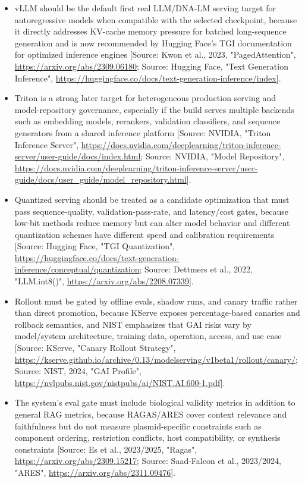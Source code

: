 \documentclass[11pt]{report}
\begin{document}
\begin{itemize}
\item vLLM should be the default first real LLM/DNA-LM serving target for autoregressive models when compatible with the selected checkpoint, because it directly addresses KV-cache memory pressure for batched long-sequence generation and is now recommended by Hugging Face's TGI documentation for optimized inference engines [Source: Kwon et al., 2023, "PagedAttention", \url{https://arxiv.org/abs/2309.06180}; Source: Hugging Face, "Text Generation Inference", \url{https://huggingface.co/docs/text-generation-inference/index}].
\item Triton is a strong later target for heterogeneous production serving and model-repository governance, especially if the build serves multiple backends such as embedding models, rerankers, validation classifiers, and sequence generators from a shared inference platform [Source: NVIDIA, "Triton Inference Server", \url{https://docs.nvidia.com/deeplearning/triton-inference-server/user-guide/docs/index.html}; Source: NVIDIA, "Model Repository", \url{https://docs.nvidia.com/deeplearning/triton-inference-server/user-guide/docs/user_guide/model_repository.html}].
\item Quantized serving should be treated as a candidate optimization that must pass sequence-quality, validation-pass-rate, and latency/cost gates, because low-bit methods reduce memory but can alter model behavior and different quantization schemes have different speed and calibration requirements [Source: Hugging Face, "TGI Quantization", \url{https://huggingface.co/docs/text-generation-inference/conceptual/quantization}; Source: Dettmers et al., 2022, "LLM.int8()", \url{https://arxiv.org/abs/2208.07339}].
\item Rollout must be gated by offline evals, shadow runs, and canary traffic rather than direct promotion, because KServe exposes percentage-based canaries and rollback semantics, and NIST emphasizes that GAI risks vary by model/system architecture, training data, operation, access, and use case [Source: KServe, "Canary Rollout Strategy", \url{https://kserve.github.io/archive/0.13/modelserving/v1beta1/rollout/canary/}; Source: NIST, 2024, "GAI Profile", \url{https://nvlpubs.nist.gov/nistpubs/ai/NIST.AI.600-1.pdf}].
\item The system's eval gate must include biological validity metrics in addition to general RAG metrics, because RAGAS/ARES cover context relevance and faithfulness but do not measure plasmid-specific constraints such as component ordering, restriction conflicts, host compatibility, or synthesis constraints [Source: Es et al., 2023/2025, "Ragas", \url{https://arxiv.org/abs/2309.15217}; Source: Saad-Falcon et al., 2023/2024, "ARES", \url{https://arxiv.org/abs/2311.09476}].

\end{itemize}
\end{document}

